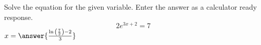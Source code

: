 \documentclass{ximera}
\author{David Kish}
\begin{document}
\begin{exercise}
Solve the equation for the given variable. Enter the answer as a calculator ready response.\\
\[
2e^{3x+2}=7
\]
$x=\answer{\frac{\ln{\left(\frac{7}{2}\right)}-2}{3}}$
\end{exercise}
\end{document}
